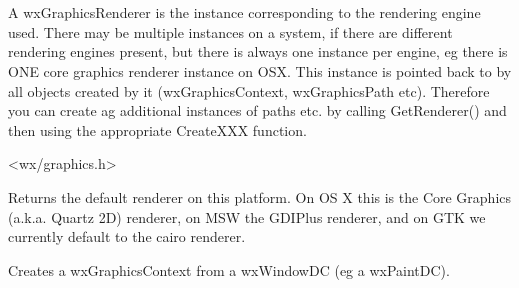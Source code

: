 
\section{}\label{wxgraphicsrenderer}

A wxGraphicsRenderer is the instance corresponding to the rendering engine used. There may be multiple instances on a system, if there are different rendering engines present, but there is always one instance per engine, eg there is ONE core graphics renderer instance on OSX. This instance is pointed back to by all objects created by it (wxGraphicsContext, wxGraphicsPath etc). Therefore you can create ag additional instances of paths etc. by calling GetRenderer() and then using the appropriate CreateXXX function.




<wx/graphics.h>



\label{wxgraphicsrenderergetdefaultrenderer}


Returns the default renderer on this platform. On OS X this is the Core Graphics (a.k.a. Quartz 2D) renderer, on MSW the GDIPlus renderer, and on GTK we currently default to the cairo renderer.

\label{wxgraphicsrenderercreatecontext}


Creates a wxGraphicsContext from a wxWindowDC (eg a wxPaintDC).


